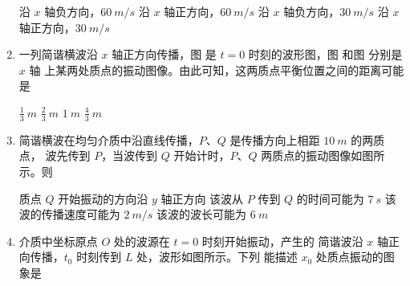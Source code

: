 \begin{enumerate}
\fourchoices
{沿 $ x $ 轴负方向，$ 60 \ m /s $}
{沿 $ x $ 轴正方向，$ 60 \ m /s $}
{沿 $ x $ 轴负方向，$ 30 \ m /s $}
{沿 $ x $ 轴正方向，$ 30 \ m /s $}


\item 
{}
一列简谐横波沿 $ x $ 轴正方向传播，图  是 $ t=0 $ 时刻的波形图，图  和图  分别是 $ x $ 轴
上某两处质点的振动图像。由此可知，这两质点平衡位置之间的距离可能是  
\begin{figure}[h!]
	\centering
\begin{subfigure}{0.4\linewidth}
	\centering
	 
	\caption{}\label{2012全国20a}
\end{subfigure}
\begin{subfigure}{0.4\linewidth}
	\centering
	 
	\caption{}\label{2012全国20b}
\end{subfigure}
\begin{subfigure}{0.4\linewidth}
	\centering
	 
	\caption{}\label{2012全国20c}
\end{subfigure}
\end{figure}





\fourchoices
{$\frac{1}{3} \ m$}
{$\frac{2}{3} \ m$}
{$ 1 \ m $}
{$\frac{4}{3} \ m$}





\item 
{}
简谐横波在均匀介质中沿直线传播，$ P $、$ Q $ 是传播方向上相距 $ 10 \ m $ 的两质点，
波先传到 $ P $，当波传到 $ Q $ 开始计时，$ P $、$ Q $ 两质点的振动图像如图所示。则  
\begin{figure}[h!]
	\centering
	
\end{figure}


\fourchoices
{质点 $ Q $ 开始振动的方向沿 $ y $ 轴正方向}
{该波从 $ P $ 传到 $ Q $ 的时间可能为 $ 7 \ s $}
{该波的传播速度可能为 $ 2 \ m /s $}
{该波的波长可能为 $ 6 \ m $}



\item 
{}
介质中坐标原点 $ O $ 处的波源在 $ t=0 $ 时刻开始振动，产生的
简谐波沿 $ x $ 轴正向传播，$ t_{0} $ 时刻传到 $ L $ 处，波形如图所示。下列
能描述 $ x_{0} $ 处质点振动的图象是  
\begin{figure}[h!]
	\centering
	
\end{figure}
\pfourchoices
{}
{}
{}
{}


\end{enumerate}

